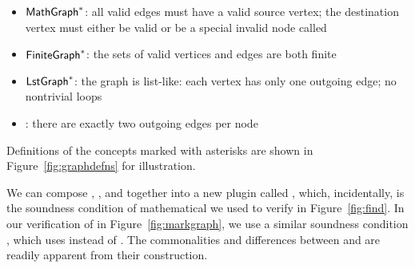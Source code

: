 \begin{itemize}
\vspace{-1ex}
\item $\mathsf{MathGraph}^{*}$: all valid edges must have a valid source vertex; the destination
vertex must either be valid or be a special invalid node called 
\item $\mathsf{FiniteGraph}^{*}$: the sets of valid vertices and edges are both finite
\item $\mathsf{LstGraph}^{*}$: the graph is list-like: each vertex has only one outgoing edge; no nontrivial loops
\item {}: there are exactly two outgoing edges per node
\end{itemize}
Definitions of the concepts marked with asterisks are
shown in Figure~\ref{fig:graphdefns} for illustration.

We can compose
, , and 
together into a new plugin called , which, incidentally, is
the soundness condition of mathematical 
we used to verify  in
Figure~\ref{fig:find}.  In our verification of  in
Figure~\ref{fig:markgraph}, we use a similar soundness condition
, which uses  instead of .
The commonalities and differences between 
and  are readily apparent from their construction.

\iffalse
\marginpar{\tiny \color{blue} Maybe move this somewhere.}
{\color{magenta}Coq also handles our notion of inherited
lemmas seamlessly: in our verfication of Find, we
work directly with a \p{LiMaFin} GeneralGraph, but, as
we saw, we still use properties such as reachability
and operations such as selective subtraction, which are defined on the
embedded PreGraph, not the GeneralGraph.
Coq handles the appropriate coercions with
remarkable elegance.}
\fi

